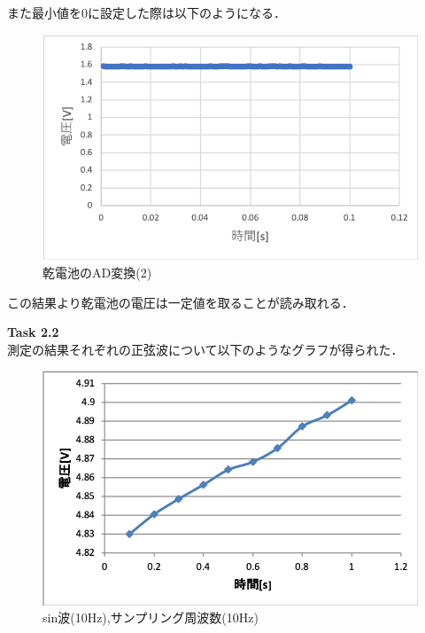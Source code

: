 \documentclass[11pt, a4paper,twocolumn]{jarticle}
\begin{document}
また最小値を0に設定した際は以下のようになる．

\begin{figure}[htbp]
 \begin{center}
  \includegraphics[width=0.8\linewidth]{fig3.png}
 \end{center}
 \caption{乾電池のAD変換(2)}
 \label{fig:3}
\end{figure}

この結果より乾電池の電圧は一定値を取ることが読み取れる．

\noindent
\textbf{Task 2.2} \\
測定の結果それぞれの正弦波について以下のようなグラフが得られた．

\begin{figure}[htbp]
 \begin{center}
  \includegraphics[width=0.8\linewidth]{fig4.png}
 \end{center}
 \caption{sin波(10Hz),サンプリング周波数(10Hz)}
 \label{fig:4}
\end{figure}
\end{document}
